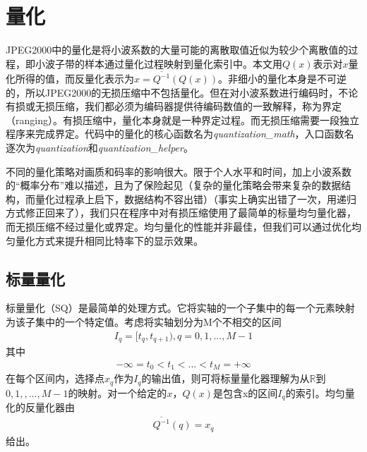 \section{量化}

JPEG2000中的量化是将小波系数的大量可能的离散取值近似为较少个离散值的过程，即小波子带的样本通过量化过程映射到量化索引中。本文用$Q(x)$表示对$x$量化所得的值，而反量化表示为$\hat{x}=\overline{Q^{-1}}(Q(x))$。非细小的量化本身是不可逆的，所以JPEG2000的无损压缩中不包括量化。但在对小波系数进行编码时，不论有损或无损压缩，我们都必须为编码器提供待编码数值的一致解释，称为界定（ranging）。有损压缩中，量化本身就是一种界定过程。而无损压缩需要一段独立程序来完成界定。代码中的量化的核心函数名为\textit{quantization\_math}，入口函数名逐次为\textit{quantization}和\textit{quantization\_helper}。\par
不同的量化策略对画质和码率的影响很大。限于个人水平和时间，加上小波系数的“概率分布”难以描述，且为了保险起见（复杂的量化策略会带来复杂的数据结构，而量化过程承上启下，数据结构不容出错）（事实上确实出错了一次，用递归方式修正回来了），我们只在程序中对有损压缩使用了最简单的标量均匀量化器，而无损压缩不经过量化或界定。均匀量化的性能并非最佳，但我们可以通过优化均匀量化方式来提升相同比特率下的显示效果。

\subsection{标量量化}
标量量化（SQ）是最简单的处理方式。它将实轴的一个子集中的每一个元素映射为该子集中的一个特定值。考虑将实轴划分为M个不相交的区间
\begin{equation}
\begin{aligned}
I_{q}=[t_{q},t_{q+1}),q=0,1,...,M-1
\end{aligned}
\end{equation}
其中
\begin{equation}
\begin{aligned}
-\infty=t_{0}<t_{1}<...<t_{M}=+\infty
\end{aligned}
\end{equation}
在每个区间内，选择点$x_{q}$作为$I_{q}$的输出值，则可将标量量化器理解为从$\mathbb{R}$到${0,1,,...,M-1}$的映射。对一个给定的$x$，$Q(x)$是包含x的区间$I_{q}$的索引。均匀量化的反量化器由
\begin{equation}
\begin{aligned}
\overline{Q^{-1}}(q)=x_{q}
\end{aligned}
\end{equation}
给出。

